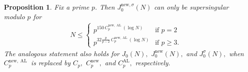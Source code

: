 \documentclass[11pt,letterpaper,reqno]{amsart}
\newtheorem{proposition}[theorem]{Proposition}
\theoremstyle{definition}
\numberwithin{equation}{section}
\numberwithin{figure}{section}
\numberwithin{table}{section}
\newcommand{\nw}{\mathrm{new}}
\begin{document}
\begin{proposition}\label{prop:vertical-supersingularity}
Fix a prime \(p\). Then $J_0^{\nw,\sigma}(N)$ can only be supersingular modulo $p$ for
\begin{align}
    N \leq \begin{cases}
        p^{150 \,C_p^{\nw,\operatorname{AL}}(\log N)} & \text{if } p = 2\\
        p^{32\frac{p}{p - 2} \, C_p^{\nw,\operatorname{AL}}(\log N)} & 
        \text{if } p \geq 3.
    \end{cases}
\end{align}
The analogous statement also holds for $J_0(N),$ $J_0^\nw(N),$ and $J_0^{\sigma}(N),$ when $C_p^{\nw, {\operatorname{AL}}}$ is replaced by $C_p,$ $C_p^\nw,$ and $C_p^{\operatorname{AL}},$ respectively.
\end{proposition}
\end{document}
